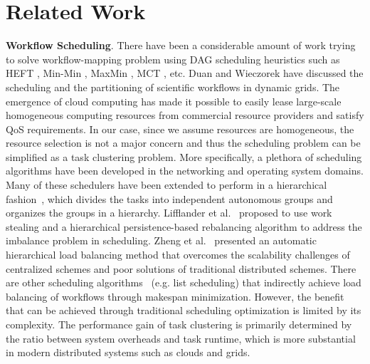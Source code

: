 \section{Related Work}
\textbf{Workflow Scheduling}. There have been a considerable amount of work trying to solve workflow-mapping problem using DAG scheduling heuristics such as HEFT \cite{Topcuoglu2002}, Min-Min \cite{Blythe2005}, MaxMin \cite{Braun2001}, MCT \cite{Braun2001}, etc. Duan \cite{Rubing2005} and Wieczorek \cite{Wieczorek2005} have discussed the scheduling and the partitioning of scientific workflows in dynamic grids. The emergence of cloud computing \cite{Armbrust2009} has made it possible to easily lease large-scale homogeneous computing resources from commercial resource providers and satisfy QoS requirements. In our case, since we assume resources are homogeneous, the resource selection is not a major concern and thus the scheduling problem can be simplified as a task clustering problem. 
More specifically, a plethora of  scheduling algorithms have been developed in the networking and operating system domains. Many of these schedulers have been extended to perform in a hierarchical fashion~\cite{Lifflander2012}, which divides the tasks into independent autonomous groups and organizes the groups in a hierarchy. Lifflander et al.~\cite{Lifflander2012} proposed to use work stealing and a hierarchical persistence-based rebalancing algorithm to address the imbalance problem in scheduling. Zheng et al.~\cite{Zheng2011} presented an automatic hierarchical load balancing method that overcomes the scalability challenges of centralized schemes and poor solutions of traditional distributed schemes. There are other scheduling algorithms~\cite{Braun2001} (e.g. list scheduling) that indirectly achieve load balancing of workflows through makespan minimization. However, the benefit that can be achieved through traditional scheduling optimization is limited by its complexity. The performance gain of task clustering is primarily determined by the ratio between system overheads and task runtime, which is more substantial in modern distributed systems such as clouds and grids. 

